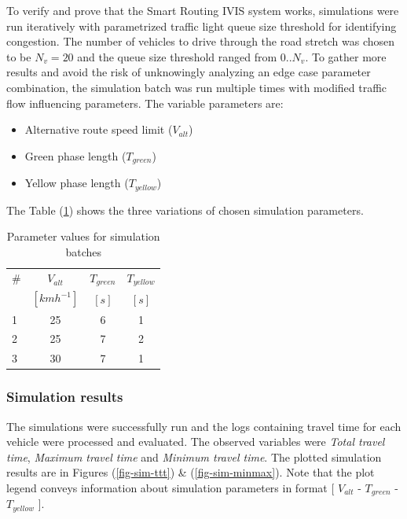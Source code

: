 \documentclass[main.tex]{subfiles}
\begin{document}
To verify and prove that the Smart Routing IVIS system works, simulations were run iteratively with 
parametrized traffic light queue size threshold for identifying congestion. The number 
of vehicles to drive through the road stretch was chosen to be $N_v = 20 $ and the queue size 
threshold ranged from $0..N_v$. To gather more results 
and avoid the risk of unknowingly analyzing an edge case parameter combination, the simulation batch 
was run multiple times with modified traffic flow influencing parameters. The variable parameters are:

\begin{itemize}
    \item Alternative route speed limit ($V_{alt}$)
    \item Green phase length ($T_{green}$)
    \item Yellow phase length ($T_{yellow}$)
\end{itemize}

The Table (\ref{tab-sims}) shows the three variations of chosen simulation parameters.

\begin{table}[htbp]
    \caption{Parameter values for simulation batches}
    \centering\begin{tabular}{lccc}
        \toprule
        \# & $V_{alt}$ & $T_{green}$ & $T_{yellow}$ \\ 
         & $[kmh^{-1}]$ & $[s]$ & $[s]$ \\ \midrule
        1 & 25  & 6 & 1 \\
        2 & 25  & 7 & 2 \\
        3 & 30  & 7 & 1 \\ \bottomrule
    \end{tabular}
    \label{tab-sims}
\end{table}

\subsubsection{Simulation results}

The simulations were successfully run and the logs containing travel time for each vehicle were processed 
and evaluated. The observed variables were \emph{Total travel time}, \emph{Maximum travel time}
and \emph{Minimum travel time}. The plotted simulation results are in Figures (\ref{fig-sim-ttt}) \& (\ref{fig-sim-minmax}).
Note that the plot legend conveys information about simulation parameters in format [ $V_{alt}$ - $T_{green}$ - $T_{yellow}$ ].
\end{document}

